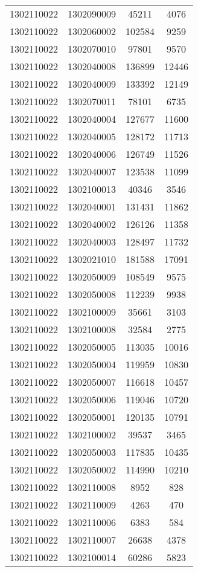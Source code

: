 \begin{longtable}{llcc}
1302110022 & 1302090009 & 45211 & 4076\\
1302110022 & 1302060002 & 102584 & 9259\\
1302110022 & 1302070010 & 97801 & 9570\\
1302110022 & 1302040008 & 136899 & 12446\\
1302110022 & 1302040009 & 133392 & 12149\\
1302110022 & 1302070011 & 78101 & 6735\\
1302110022 & 1302040004 & 127677 & 11600\\
1302110022 & 1302040005 & 128172 & 11713\\
1302110022 & 1302040006 & 126749 & 11526\\
1302110022 & 1302040007 & 123538 & 11099\\
1302110022 & 1302100013 & 40346 & 3546\\
1302110022 & 1302040001 & 131431 & 11862\\
1302110022 & 1302040002 & 126126 & 11358\\
1302110022 & 1302040003 & 128497 & 11732\\
1302110022 & 1302021010 & 181588 & 17091\\
1302110022 & 1302050009 & 108549 & 9575\\
1302110022 & 1302050008 & 112239 & 9938\\
1302110022 & 1302100009 & 35661 & 3103\\
1302110022 & 1302100008 & 32584 & 2775\\
1302110022 & 1302050005 & 113035 & 10016\\
1302110022 & 1302050004 & 119959 & 10830\\
1302110022 & 1302050007 & 116618 & 10457\\
1302110022 & 1302050006 & 119046 & 10720\\
1302110022 & 1302050001 & 120135 & 10791\\
1302110022 & 1302100002 & 39537 & 3465\\
1302110022 & 1302050003 & 117835 & 10435\\
1302110022 & 1302050002 & 114990 & 10210\\
1302110022 & 1302110008 & 8952 & 828\\
1302110022 & 1302110009 & 4263 & 470\\
1302110022 & 1302110006 & 6383 & 584\\
1302110022 & 1302110007 & 26638 & 4378\\
1302110022 & 1302100014 & 60286 & 5823\\

\end{longtable}
